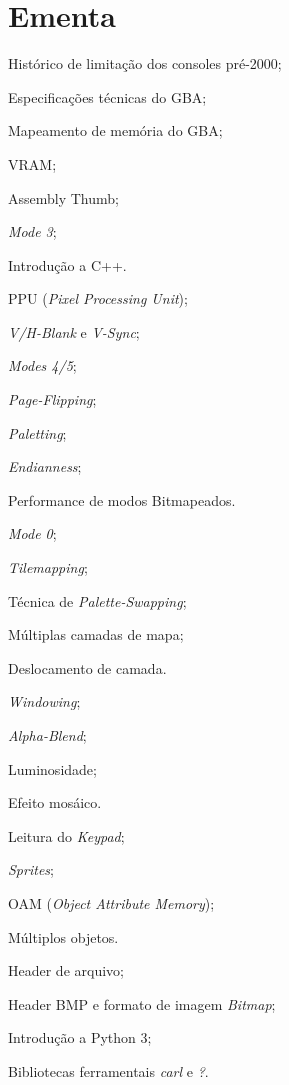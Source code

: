 \documentclass{article}
\begin{document}
\section{Ementa}
\begin{itemize*}[label={}]
    \item[] Histórico de limitação dos consoles pré-2000;
    \item[] Especificações técnicas do GBA;
    \item[] Mapeamento de memória do GBA;
    \item[] VRAM;
    \item[] Assembly Thumb;
    \item[] \textit{Mode 3};
    \item[] Introdução a C++.
    \item[] PPU (\textit{Pixel Processing Unit});
    \item[] \textit{V/H-Blank} e \textit{V-Sync};
    \item[] \textit{Modes 4/5};
    \item[] \textit{Page-Flipping};
    \item[] \textit{Paletting};
    \item[] \textit{Endianness};
    \item[] Performance de modos Bitmapeados.
    \item[] \textit{Mode 0};
    \item[] \textit{Tilemapping};
    \item[] Técnica de \textit{Palette-Swapping};
    \item[] Múltiplas camadas de mapa;
    \item[] Deslocamento de camada.
    \item[] \textit{Windowing};
    \item[] \textit{Alpha-Blend};
    \item[] Luminosidade;
    \item[] Efeito mosáico.
    \item[] Leitura do \textit{Keypad};
    \item[] \textit{Sprites};
    \item[] OAM (\textit{Object Attribute Memory});
    \item[] Múltiplos objetos.
    \item[] Header de arquivo;
    \item[] Header BMP e formato de imagem \textit{Bitmap};
    \item[] Introdução a Python 3;
    \item[] Bibliotecas ferramentais \textit{carl} e \textit{?}.

\end{itemize*}
\end{document}
